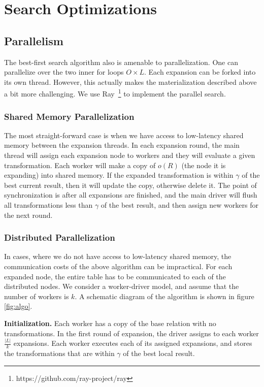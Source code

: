 \section{Search Optimizations}\label{s:opts}

\subsection{Parallelism}\label{s:parallel}
The best-first search algorithm also is amenable to parallelization. One can parallelize over the two inner for loops $O \times L$. Each expansion can be forked into its own thread. However, this actually makes the materialization described above a bit more challenging. We use Ray~\footnote{https://github.com/ray-project/ray} to implement the parallel search. 

\subsubsection{Shared Memory Parallelization}
The most straight-forward case is when we have access to low-latency shared memory between the expansion threads. In each expansion round, the main thread will assign each expansion node to workers and they will evaluate a given transformation. Each worker will make a copy of $o(R)$ (the node it is expanding) into shared memory. 
If the expanded transformation is within $\gamma$ of the best current result, then it will update the copy, otherwise delete it. The point of synchronization is after all expansions are finished, and the main driver will flush all transformations less than $\gamma$ of the best result, and then assign new workers for the next round. 

\subsubsection{Distributed Parallelization}
In cases, where we do not have access to low-latency shared memory, the communication costs of the above algorithm can be impractical. For each expanded node, the entire table has to be communicated to each of the distributed nodes.
We consider a worker-driver model, and assume that the number of workers is $k$.
A schematic diagram of the algorithm is shown in figure \ref{fig:algo}.

\vspace{0.25em} \noindent  \textbf{Initialization. } 
Each worker has a copy of the base relation with no transformations.
In the first round of expansion, the driver assigns to each worker $\frac{|L|}{k}$ expansions. 
Each worker executes each of its assigned expansions, and stores the transformations that are within $\gamma$ of the best local result.

